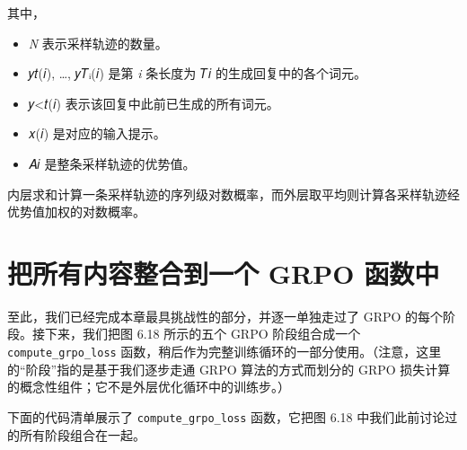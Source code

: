 
\begin{mySidebarBox}

其中，

\begin{itemize}
\item \emph{N }表示采样轨迹的数量。
\item 𝑦𝑡(𝑖), …, 𝑦𝑇ᵢ(𝑖) 是第 \emph{i} 条长度为 𝑇𝑖 的生成回复中的各个词元。
\item 𝑦\textless{}𝑡(𝑖) 表示该回复中此前已生成的所有词元。
\item 𝑥(𝑖) 是对应的输入提示。
\item 𝐴𝑖 是整条采样轨迹的优势值。
\end{itemize}

内层求和计算一条采样轨迹的序列级对数概率，而外层取平均则计算各采样轨迹经优势值加权的对数概率。

\end{mySidebarBox}

\section{把所有内容整合到一个 GRPO 函数中}

至此，我们已经完成本章最具挑战性的部分，并逐一单独走过了 GRPO 的每个阶段。接下来，我们把图 6.18 所示的五个 GRPO 阶段组合成一个 \texttt{compute\_grpo\_loss} 函数，稍后作为完整训练循环的一部分使用。（注意，这里的“阶段”指的是基于我们逐步走通 GRPO 算法的方式而划分的 GRPO 损失计算的概念性组件；它不是外层优化循环中的训练步。）


下面的代码清单展示了 \texttt{compute\_grpo\_loss} 函数，它把图 6.18 中我们此前讨论过的所有阶段组合在一起。

